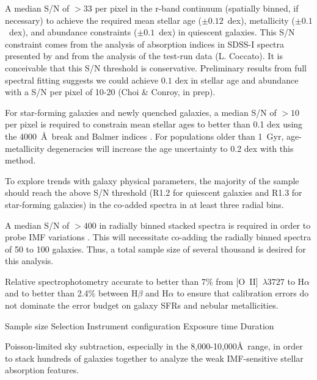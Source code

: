 \documentclass[11pt,a4paper,twoside,onecolumn,openany,final,oldfontcommands]{memoir}
\begin{document}
\begin{requirement}

\reqitem A median S/N of $>33$ per pixel in the r-band continuum (spatially binned, if necessary) to achieve the required mean stellar age ($\pm0.12$~dex), metallicity ($\pm0.1$~dex), and abundance constraints ($\pm0.1$~dex) in quiescent galaxies. This S/N constraint comes from the analysis of absorption indices in SDSS-I spectra presented by \cite{johansson12} and from the analysis of the test-run data (L. Coccato).  It is conceivable that this S/N threshold is conservative. Preliminary results from full spectral fitting suggests we could achieve $0.1$ dex in stellar age and abundance with a S/N per pixel of 10-20 (Choi \& Conroy, in prep).
   

\reqitem For star-forming galaxies and newly quenched galaxies, a median S/N of $>10$ per pixel is required to constrain mean stellar ages to better than 0.1 dex using the 4000~\AA\ break and Balmer indices \citep{kauffmann03a}.  For populations older than 1~Gyr, age-metallicity degeneracies will increase the age uncertainty to 0.2 dex with this method.

\reqitem To explore trends with galaxy physical parameters, the majority of the sample should reach the above S/N threshold (R1.2 for quiescent galaxies and R1.3 for star-forming galaxies) in the co-added spectra in at least three radial bins.

\reqitem A median S/N of $>400$ in radially binned stacked spectra is required in order to probe IMF variations \citep{ferreras2013}. This will necessitate co-adding the radially binned spectra of 50 to 100 galaxies.  Thus, a total sample size of several thousand is desired for this analysis.

\reqitem Relative spectrophotometry accurate to better than 7\% from [O~II]~$\lambda3727$ to H$\alpha$ and to better than 2.4\% between H$\beta$ and H$\alpha$ to ensure that calibration errors do not dominate the error budget on galaxy SFRs and nebular metallicities.
  
\end{requirement}


\begin{programrequirement}

\reqitem Sample size
\reqitem Selection 
\reqitem Instrument configuration 
\reqitem Exposure time
\reqitem Duration

\reqitem Poisson-limited sky subtraction, especially in the 8,000-10,000\AA\ range, in order to stack hundreds of galaxies together to analyze the weak IMF-sensitive stellar absorption features.

\end{programrequirement}
\end{document}
